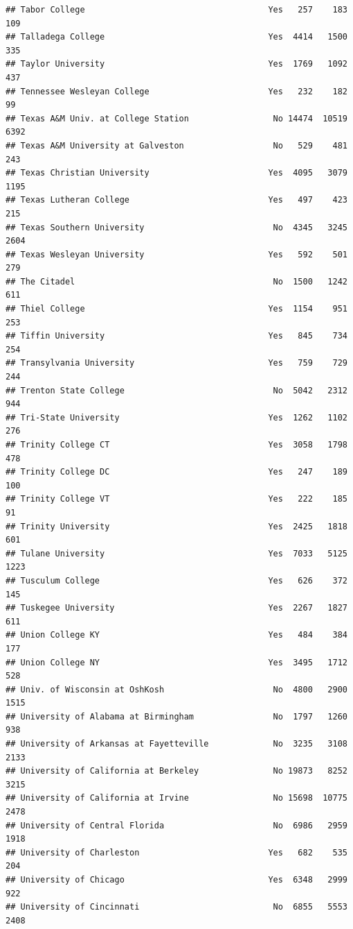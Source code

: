 \documentclass[
]{article}
\begin{document}
\begin{verbatim}
## Tabor College                                     Yes   257    183    109
## Talladega College                                 Yes  4414   1500    335
## Taylor University                                 Yes  1769   1092    437
## Tennessee Wesleyan College                        Yes   232    182     99
## Texas A&M Univ. at College Station                 No 14474  10519   6392
## Texas A&M University at Galveston                  No   529    481    243
## Texas Christian University                        Yes  4095   3079   1195
## Texas Lutheran College                            Yes   497    423    215
## Texas Southern University                          No  4345   3245   2604
## Texas Wesleyan University                         Yes   592    501    279
## The Citadel                                        No  1500   1242    611
## Thiel College                                     Yes  1154    951    253
## Tiffin University                                 Yes   845    734    254
## Transylvania University                           Yes   759    729    244
## Trenton State College                              No  5042   2312    944
## Tri-State University                              Yes  1262   1102    276
## Trinity College CT                                Yes  3058   1798    478
## Trinity College DC                                Yes   247    189    100
## Trinity College VT                                Yes   222    185     91
## Trinity University                                Yes  2425   1818    601
## Tulane University                                 Yes  7033   5125   1223
## Tusculum College                                  Yes   626    372    145
## Tuskegee University                               Yes  2267   1827    611
## Union College KY                                  Yes   484    384    177
## Union College NY                                  Yes  3495   1712    528
## Univ. of Wisconsin at OshKosh                      No  4800   2900   1515
## University of Alabama at Birmingham                No  1797   1260    938
## University of Arkansas at Fayetteville             No  3235   3108   2133
## University of California at Berkeley               No 19873   8252   3215
## University of California at Irvine                 No 15698  10775   2478
## University of Central Florida                      No  6986   2959   1918
## University of Charleston                          Yes   682    535    204
## University of Chicago                             Yes  6348   2999    922
## University of Cincinnati                           No  6855   5553   2408

\end{verbatim}
\end{document}
